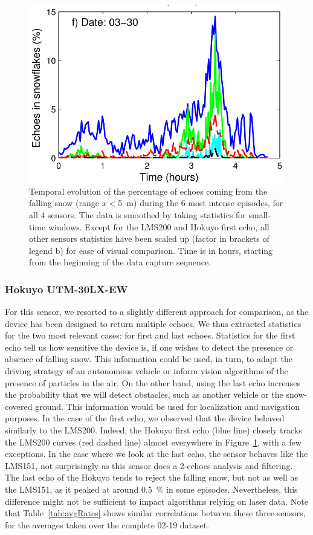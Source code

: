 \begin{figure}
    \includegraphics[width=0.45\linewidth]{./img/chap_lidar/timings_cropped_f.png}
    \caption[Temporal evolution of the percentage of echoes coming from the falling snow within \SI{5}{\meter} of the sensors during the 6 most intense snowfall episodes.]{Temporal evolution of the percentage of echoes coming from the falling snow (range $x<$\SI{5}{\meter}) during the 6 most intense episodes, for all 4 sensors. The data is smoothed by taking statistics for small-time windows. Except for the LMS200 and Hokuyo first echo, all other sensors statistics have been scaled up (factor in brackets of legend b) for ease of visual comparison. Time is in hours, starting from the beginning of the data capture sequence.}
    \label{fig:TimingSnow}
\end{figure}


\subsubsection{Hokuyo UTM-30LX-EW}
For this sensor, we resorted to a slightly different approach for comparison, as the device has been designed to return multiple echoes. We thus extracted statistics for the two most relevant cases: for first and last echoes. Statistics for the first echo tell us how sensitive the device is, if one wishes to detect the presence or absence of falling snow. This information could be used, in turn, to adapt the driving strategy of an autonomous vehicle or inform vision algorithms of the presence of particles in the air. On the other hand, using the last echo increases the probability that we will detect obstacles, such as another vehicle or the snow-covered ground. This information would be used for localization and navigation purposes. In the case of the first echo, we observed that the device behaved similarly to the LMS200. Indeed, the Hokuyo first echo (blue line) closely tracks the LMS200 curves (red dashed line) almost everywhere in Figure~\ref{fig:TimingSnow}, with a few exceptions.  In the case where we look at the last echo, the sensor behaves like the LMS151, not surprisingly as this sensor does a 2-echoes analysis and filtering. The last echo of the Hokuyo tends to reject the falling snow, but not as well as the LMS151, as it peaked at around 0.5~\% in some episodes. Nevertheless, this difference might not be sufficient to impact algorithms relying on laser data. Note that Table~\ref{tab:avgRates} shows similar correlations between these three sensors, for the averages taken over the complete 02-19 dataset.


